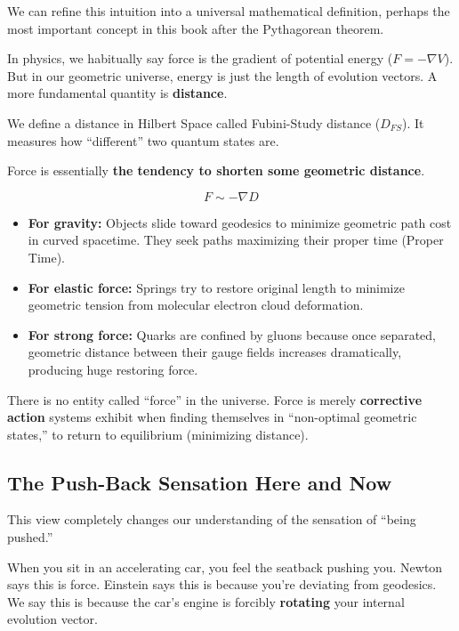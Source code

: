 \documentclass[11pt,a4paper,twoside]{book}
\begin{document}
We can refine this intuition into a universal mathematical definition, perhaps the most important concept in this book after the Pythagorean theorem.

In physics, we habitually say force is the gradient of potential energy ($F = -\nabla V$). But in our geometric universe, energy is just the length of evolution vectors. A more fundamental quantity is \textbf{distance}.

We define a distance in Hilbert Space called Fubini-Study distance ($D_{FS}$). It measures how ``different'' two quantum states are.

Force is essentially \textbf{the tendency to shorten some geometric distance}.

$$F \sim -\nabla D$$

\begin{itemize}
\item \textbf{For gravity:} Objects slide toward geodesics to minimize geometric path cost in curved spacetime. They seek paths maximizing their proper time (Proper Time).

\item \textbf{For elastic force:} Springs try to restore original length to minimize geometric tension from molecular electron cloud deformation.

\item \textbf{For strong force:} Quarks are confined by gluons because once separated, geometric distance between their gauge fields increases dramatically, producing huge restoring force.
\end{itemize}

There is no entity called ``force'' in the universe. Force is merely \textbf{corrective action} systems exhibit when finding themselves in ``non-optimal geometric states,'' to return to equilibrium (minimizing distance).

\subsection{The Push-Back Sensation Here and Now}

This view completely changes our understanding of the sensation of ``being pushed.''

When you sit in an accelerating car, you feel the seatback pushing you. Newton says this is force. Einstein says this is because you're deviating from geodesics. We say this is because the car's engine is forcibly \textbf{rotating} your internal evolution vector.
\end{document}
